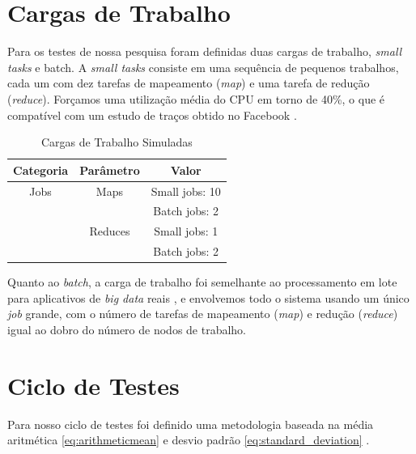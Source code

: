 \section{Cargas de Trabalho}


Para os testes de nossa pesquisa foram definidas duas cargas de trabalho, \emph{small tasks} e {batch}. A \emph{small tasks} consiste em uma sequência de pequenos trabalhos, cada um com dez tarefas de mapeamento (\emph{map}) e uma tarefa de redução (\emph{reduce}). Forçamos uma utilização média do CPU em torno de 40\%, o que é compatível com um estudo de traços obtido no Facebook \cite{chen2011case}.
 
\begin{table}[!htp]
\centering
\caption{Cargas de Trabalho Simuladas}
\label{Cargas de Trabalho Simuladas}
\def\arraystretch{1.2}
\begin{tabular}{c c c}
\hline
Categoria & Parâmetro & Valor \\
\hline
Jobs & Maps & Small jobs: 10\\
 & & Batch jobs: 2\\
 & Reduces & Small jobs: 1\\
 & & Batch jobs: 2\\
\hline
\end{tabular}
\end{table}

Quanto ao \emph{batch}, a carga de trabalho foi semelhante ao processamento em lote para aplicativos de \emph{big data} reais \cite{chen2012interactive}, e envolvemos todo o sistema usando um único \emph{job} grande, com o número de tarefas de mapeamento (\emph{map}) e redução (\emph{reduce}) igual ao dobro do número de nodos de trabalho.

\section{Ciclo de Testes}

Para nosso ciclo de testes foi definido uma metodologia baseada na média aritmética \ref{eq:arithmeticmean} \cite{plackett1958studies} e desvio padrão \ref{eq:standard_deviation} \cite{brenner1988simple}.

